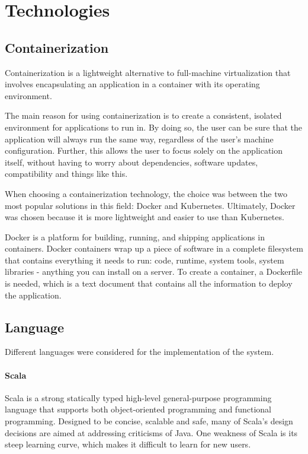 \documentclass[12pt,a4paper,openright,twoside]{book}
\begin{document}
\section{Technologies}

\subsection{Containerization}

Containerization is a lightweight alternative to full-machine virtualization that involves encapsulating an application in a container with its operating environment.

The main reason for using containerization is to create a consistent, isolated environment for applications to run in.
By doing so, the user can be sure that the application will always run the same way, regardless of the user's machine configuration. 
Further, this allows the user to focus solely on the application itself, without having to worry about dependencies, software updates, compatibility and things like this.

When choosing a containerization technology, the choice was between the two most popular solutions in this field: Docker and Kubernetes.
Ultimately, Docker was chosen because it is more lightweight and easier to use than Kubernetes.

Docker is a platform for building, running, and shipping applications in containers.
Docker containers wrap up a piece of software in a complete filesystem that contains everything it needs to run:
code, runtime, system tools, system libraries - anything you can install on a server.
To create a container, a Dockerfile is needed, which is a text document that contains all the information to deploy the application.

\subsection{Language}
Different languages were considered for the implementation of the system.

\paragraph*{Scala}
Scala is a strong statically typed high-level general-purpose programming language that supports both object-oriented 
programming and functional programming. 
Designed to be concise, scalable and safe, many of Scala's design decisions are aimed at addressing criticisms of Java.
\cite{1}
One weakness of Scala is its steep learning curve, which makes it difficult to learn for new users.
\end{document}
